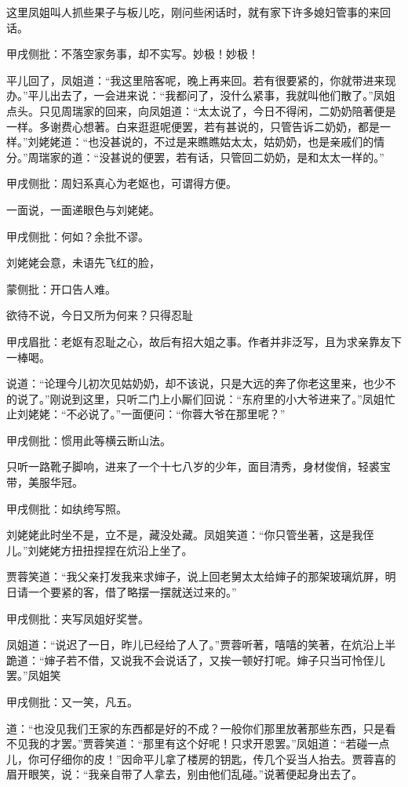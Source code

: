 \begin{parag}

    这里凤姐叫人抓些果子与板儿吃，刚问些闲话时，就有家下许多媳妇管事的来回话。\begin{note}甲戌侧批：不落空家务事，却不实写。妙极！妙极！\end{note}平儿回了，凤姐道：“我这里陪客呢，晚上再来回。若有很要紧的，你就带进来现办。”平儿出去了，一会进来说：“我都问了，没什么紧事，我就叫他们散了。”凤姐点头。只见周瑞家的回来，向凤姐道：“太太说了，今日不得闲，二奶奶陪著便是一样。多谢费心想著。白来逛逛呢便罢，若有甚说的，只管告诉二奶奶，都是一样。”刘姥姥道：“也没甚说的，不过是来瞧瞧姑太太，姑奶奶，也是亲戚们的情分。”周瑞家的道：“没甚说的便罢，若有话，只管回二奶奶，是和太太一样的。”\begin{note}甲戌侧批：周妇系真心为老妪也，可谓得方便。\end{note}一面说，一面递眼色与刘姥姥。\begin{note}甲戌侧批：何如？余批不谬。\end{note}刘姥姥会意，未语先飞红的脸，\begin{note}蒙侧批：开口告人难。\end{note}欲待不说，今日又所为何来？只得忍耻\begin{note}甲戌眉批：老妪有忍耻之心，故后有招大姐之事。作者并非泛写，且为求亲靠友下一棒喝。\end{note}说道：“论理今儿初次见姑奶奶，却不该说，只是大远的奔了你老这里来，也少不的说了。”刚说到这里，只听二门上小厮们回说：“东府里的小大爷进来了。”凤姐忙止刘姥姥：“不必说了。”一面便问：“你蓉大爷在那里呢？”\begin{note}甲戌侧批：惯用此等横云断山法。\end{note}只听一路靴子脚响，进来了一个十七八岁的少年，面目清秀，身材俊俏，轻裘宝带，美服华冠。\begin{note}甲戌侧批：如纨绔写照。\end{note}刘姥姥此时坐不是，立不是，藏没处藏。凤姐笑道：“你只管坐著，这是我侄儿。”刘姥姥方扭扭捏捏在炕沿上坐了。
\end{parag}


\begin{parag}

    贾蓉笑道：“我父亲打发我来求婶子，说上回老舅太太给婶子的那架玻璃炕屏，明日请一个要紧的客，借了略摆一摆就送过来的。”\begin{note}甲戌侧批：夹写凤姐好奖誉。\end{note}凤姐道：“说迟了一日，昨儿已经给了人了。”贾蓉听著，嘻嘻的笑著，在炕沿上半跪道：“婶子若不借，又说我不会说话了，又挨一顿好打呢。婶子只当可怜侄儿罢。”凤姐笑\begin{note}甲戌侧批：又一笑，凡五。\end{note}道：“也没见我们王家的东西都是好的不成？一般你们那里放著那些东西，只是看不见我的才罢。”贾蓉笑道：“那里有这个好呢！只求开恩罢。”凤姐道：“若碰一点儿，你可仔细你的皮！”因命平儿拿了楼房的钥匙，传几个妥当人抬去。贾蓉喜的眉开眼笑，说：“我亲自带了人拿去，别由他们乱碰。”说著便起身出去了。
\end{parag}


